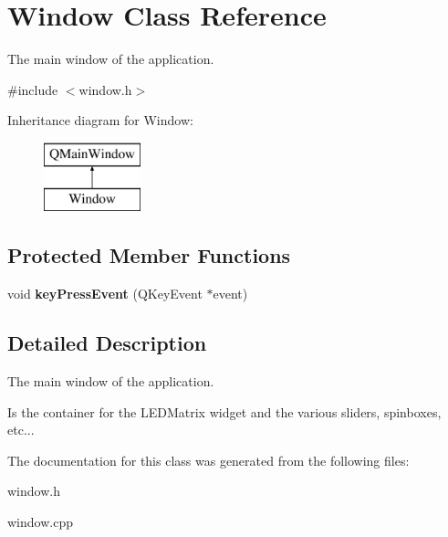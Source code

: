 \hypertarget{class_window}{\section{Window Class Reference}
\label{class_window}
}


The main window of the application.  




{\ttfamily \#include $<$window.\+h$>$}

Inheritance diagram for Window\+:\begin{figure}[H]
\begin{center}
\leavevmode
\includegraphics[height=2.000000cm]{class_window}
\end{center}
\end{figure}
\subsection*{Protected Member Functions}
\begin{DoxyCompactItemize}
\item 
\hypertarget{class_window_a52322a90bc51afcd17b90a152d64f36a}{void {\bfseries key\+Press\+Event} (Q\+Key\+Event $\ast$event)}\label{class_window_a52322a90bc51afcd17b90a152d64f36a}

\end{DoxyCompactItemize}


\subsection{Detailed Description}
The main window of the application. 

Is the container for the L\+E\+D\+Matrix widget and the various sliders, spinboxes, etc... 

The documentation for this class was generated from the following files\+:\begin{DoxyCompactItemize}
\item 
window.\+h\item 
window.\+cpp\end{DoxyCompactItemize}
